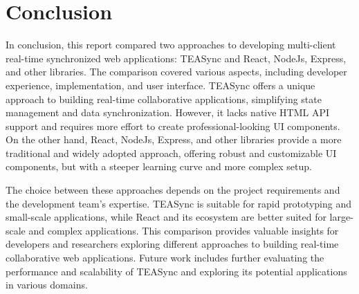 \chapter{Conclusion}
\label{chap:conclusion}

In conclusion, this report compared two approaches to developing multi-client real-time synchronized web applications: TEASync and React, NodeJs, Express, and other libraries. The comparison covered various aspects, including developer experience, implementation, and user interface. TEASync offers a unique approach to building real-time collaborative applications, simplifying state management and data synchronization. However, it lacks native HTML API support and requires more effort to create professional-looking UI components. On the other hand, React, NodeJs, Express, and other libraries provide a more traditional and widely adopted approach, offering robust and customizable UI components, but with a steeper learning curve and more complex setup.

The choice between these approaches depends on the project requirements and the development team’s expertise. TEASync is suitable for rapid prototyping and small-scale applications, while React and its ecosystem are better suited for large-scale and complex applications. This comparison provides valuable insights for developers and researchers exploring different approaches to building real-time collaborative web applications. Future work includes further evaluating the performance and scalability of TEASync and exploring its potential applications in various domains.